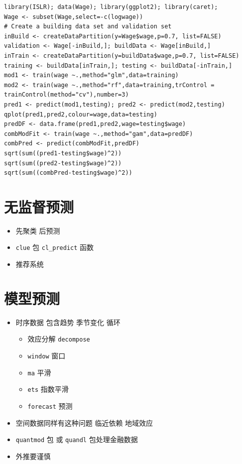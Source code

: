 \documentclass[]{book}
\providecommand{\tightlist}{%
  \setlength{\itemsep}{0pt}\setlength{\parskip}{0pt}}
\begin{document}
\begin{verbatim}
library(ISLR); data(Wage); library(ggplot2); library(caret);
Wage <- subset(Wage,select=-c(logwage))
# Create a building data set and validation set
inBuild <- createDataPartition(y=Wage$wage,p=0.7, list=FALSE)
validation <- Wage[-inBuild,]; buildData <- Wage[inBuild,]
inTrain <- createDataPartition(y=buildData$wage,p=0.7, list=FALSE)
training <- buildData[inTrain,]; testing <- buildData[-inTrain,]
mod1 <- train(wage ~.,method="glm",data=training)
mod2 <- train(wage ~.,method="rf",data=training,trControl = trainControl(method="cv"),number=3)
pred1 <- predict(mod1,testing); pred2 <- predict(mod2,testing)
qplot(pred1,pred2,colour=wage,data=testing)
predDF <- data.frame(pred1,pred2,wage=testing$wage)
combModFit <- train(wage ~.,method="gam",data=predDF)
combPred <- predict(combModFit,predDF)
sqrt(sum((pred1-testing$wage)^2))
sqrt(sum((pred2-testing$wage)^2))
sqrt(sum((combPred-testing$wage)^2))
\end{verbatim}

\section{无监督预测}

\begin{itemize}
\tightlist
\item
  先聚类 后预测
\item
  \texttt{clue} 包 \texttt{cl\_predict} 函数
\item
  推荐系统
\end{itemize}

\section{模型预测}

\begin{itemize}
\tightlist
\item
  时序数据 包含趋势 季节变化 循环

  \begin{itemize}
  \tightlist
  \item
    效应分解 \texttt{decompose}
  \item
    \texttt{window} 窗口
  \item
    \texttt{ma} 平滑
  \item
    \texttt{ets} 指数平滑
  \item
    \texttt{forecast} 预测
  \end{itemize}
\item
  空间数据同样有这种问题 临近依赖 地域效应
\item
  \texttt{quantmod} 包 或 \texttt{quandl} 包处理金融数据
\item
  外推要谨慎
\end{itemize}
\end{document}
